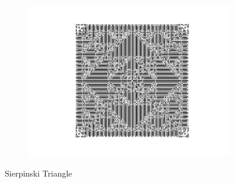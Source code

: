 \documentclass[11pt]{article}
\begin{document}
\begin{figure}[!ht]
	\centering
	\begin{subfigure}{\textwidth}
		\centering
  	  	\includegraphics[width=1\linewidth]{images/sierpinski.png}
  	  	\label{fig:sierpinski1}
	\end{subfigure}
	\caption{Sierpinski Triangle}
	\label{fig:sierpinski_triangle}
\end{figure}
\end{document}
